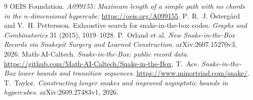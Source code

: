 \documentclass[11pt,a4paper]{article}
\theoremstyle{definition}
\begin{document}
\begin{thebibliography}{9}
 OEIS Foundation. \emph{A099155: Maximum length of a simple path with no chords in the $n$-dimensional hypercube}. \url{https://oeis.org/A099155}.
 P.~R.~J. Östergård and V.~H. Pettersson. Exhaustive search for snake-in-the-box codes. \emph{Graphs and Combinatorics} 31 (2015), 1019--1028.
 P.~Orland et al. \emph{New Snake-in-the-Box Records via Snakepit Surgery and Learned Construction}. arXiv:2607.15270v3, 2026.
 Math-AI-Caltech. \emph{Snake-in-the-Box: public record data}. \url{https://github.com/Math-AI-Caltech/Snake-in-the-Box}.
 T.~Ace. \emph{Snake-in-the-Box lower bounds and transition sequences}. \url{https://www.minortriad.com/snake/}.
 T.~Taylor. \emph{Constructing longer snakes and improved asymptotic bounds in hypercubes}. arXiv:2609.27483v1, 2026.
\end{thebibliography}
\end{document}

